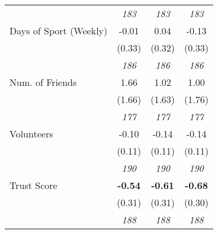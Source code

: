 \begin{tabular}{l c c c}
& \textit{ 183 } & \textit{ 183 } & \textit{ 183 } \\
Days of Sport (Weekly) & -0.01 & 0.04 & -0.13 \\
& (0.33) & (0.32) & (0.33) \\
& \textit{ 186 } & \textit{ 186 } & \textit{ 186 } \\
Num. of Friends & 1.66 & 1.02 & 1.00 \\
& (1.66) & (1.63) & (1.76) \\
& \textit{ 177 } & \textit{ 177 } & \textit{ 177 } \\
Volunteers & -0.10 & -0.14 & -0.14 \\
& (0.11) & (0.11) & (0.11) \\
& \textit{ 190 } & \textit{ 190 } & \textit{ 190 } \\
Trust Score & \textbf{ -0.54 } & \textbf{ -0.61 } & \textbf{ -0.68 } \\
& (0.31) & (0.31) & (0.30) \\
& \textit{ 188 } & \textit{ 188 } & \textit{ 188 } \\
\bottomrule
\end{tabular}

